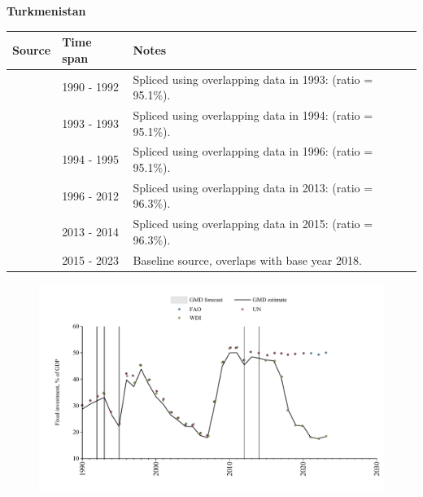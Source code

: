 \documentclass[12pt,a4paper,landscape]{article}
\begin{document}
\begin{adjustbox}{max totalsize={\paperwidth}{\paperheight},center}
\begin{minipage}[t][\textheight][t]{\textwidth}
\vspace*{0.5cm}
{}
\begin{center}
{\Large\bfseries Turkmenistan}
\end{center}
\vspace{0.5cm}
\begin{table}[H]
\centering
\small
\begin{tabular}{|l|l|l|}
\hline
\textbf{Source} & \textbf{Time span} & \textbf{Notes} \\
\hline
\rowcolor{white}\cite{UN}& 1990 - 1992 &Spliced using overlapping data in 1993: (ratio = 95.1\%).\\
\rowcolor{lightgray}\cite{WDI}& 1993 - 1993 &Spliced using overlapping data in 1994: (ratio = 95.1\%).\\
\rowcolor{white}\cite{UN}& 1994 - 1995 &Spliced using overlapping data in 1996: (ratio = 95.1\%).\\
\rowcolor{lightgray}\cite{WDI}& 1996 - 2012 &Spliced using overlapping data in 2013: (ratio = 96.3\%).\\
\rowcolor{white}\cite{UN}& 2013 - 2014 &Spliced using overlapping data in 2015: (ratio = 96.3\%).\\
\rowcolor{lightgray}\cite{WDI}& 2015 - 2023 &Baseline source, overlaps with base year 2018.\\
\hline
\end{tabular}
\end{table}
\begin{figure}[H]
\centering
\includegraphics[width=\textwidth,height=0.6\textheight,keepaspectratio]{graphs/TKM_finv_GDP.pdf}
\end{figure}
\end{minipage}
\end{adjustbox}
\end{document}
